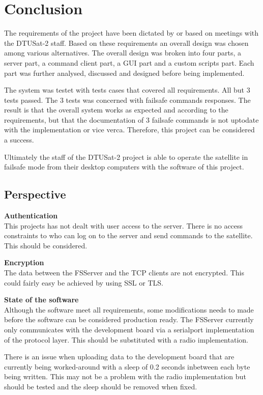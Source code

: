 \chapter{Conclusion}
\label{chap:conclusion}
The requirements of the project have been dictated by or based on meetings with the DTUSat-2 staff. Based on these requirements an overall design was chosen among various alternatives. The overall design was broken into four parts, a server part, a command client part, a GUI part and a custom scripts part. Each part was further analysed, discussed and designed before being implemented.

The system was testet with tests cases that covered all requirements. All but 3 tests passed. The 3 tests was concerned with failsafe commands responses. The result is that the overall system works as expected and according to the requirements, but that the documentation of 3 failsafe commands is not uptodate with the implementation or vice verca. Therefore, this project can be considered a success.

Ultimately the staff of the DTUSat-2 project is able to operate the satellite in failsafe mode from their desktop computers with the software of this project.

\section{Perspective}
\textbf{Authentication} \\
This projects has not dealt with user access to the server. There is no access constraints to who can log on to the server and send commands to the satellite. This should be considered.

\textbf{Encryption} \\
The data between the FSServer and the TCP clients are not encrypted. This could fairly easy be achieved by using SSL or TLS.

\textbf{State of the software} \\
Although the software meet all requirements, some modifications needs to made before the software can be considered production ready.
The FSServer currently only communicates with the development board via a serialport implementation of the protocol layer. This should be substituted with a radio implementation.

There is an issue when uploading data to the development board that are currently being worked-around with a sleep of 0.2 seconds inbetween each byte being written. This may not be a problem with the radio implementation but should be tested and the sleep should be removed when fixed.
